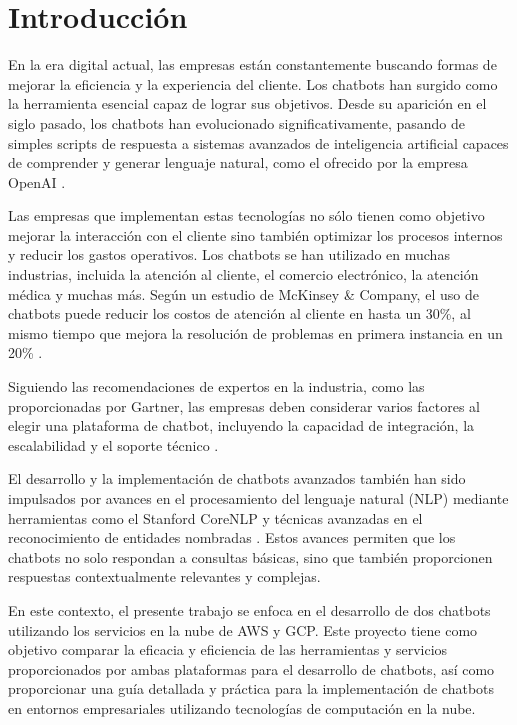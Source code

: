 \chapter{Introducción}

En la era digital actual, las empresas están constantemente buscando formas de mejorar la eficiencia y la experiencia del cliente. Los chatbots han surgido como la herramienta esencial capaz de lograr sus objetivos. Desde su aparición en el siglo pasado, los chatbots han evolucionado significativamente, pasando de simples scripts de respuesta a sistemas avanzados de inteligencia artificial capaces de comprender y generar lenguaje natural, como el ofrecido por la empresa OpenAI \citep{jurafsky2020speech}.

Las empresas que implementan estas tecnologías no sólo tienen como objetivo mejorar la interacción con el cliente sino también optimizar los procesos internos y reducir los gastos operativos. Los chatbots se han utilizado en muchas industrias, incluida la atención al cliente, el comercio electrónico, la atención médica y muchas más.
 Según un estudio de McKinsey \& Company, el uso de chatbots puede reducir los costos de atención al cliente en hasta un 30\%, al mismo tiempo que mejora la resolución de problemas en primera instancia en un 20\% \citep{online:McKinsey}.

Siguiendo las recomendaciones de expertos en la industria, como las proporcionadas por Gartner, las empresas deben considerar varios factores al elegir una plataforma de chatbot, incluyendo la capacidad de integración, la escalabilidad y el soporte técnico \citep{online:Gartner}. 

El desarrollo y la implementación de chatbots avanzados también han sido impulsados por avances en el procesamiento del lenguaje natural (NLP) mediante herramientas como el Stanford CoreNLP y técnicas avanzadas en el reconocimiento de entidades nombradas \citep{manning2014stanford, ratinov2009design}. Estos avances permiten que los chatbots no solo respondan a consultas básicas, sino que también proporcionen respuestas contextualmente relevantes y complejas.

En este contexto, el presente trabajo se enfoca en el desarrollo de dos chatbots utilizando los servicios en la nube de AWS y GCP. Este proyecto tiene como objetivo comparar la eficacia y eficiencia de las herramientas y servicios proporcionados por ambas plataformas para el desarrollo de chatbots, así como proporcionar una guía detallada y práctica para la implementación de chatbots en entornos empresariales utilizando tecnologías de computación en la nube. 

